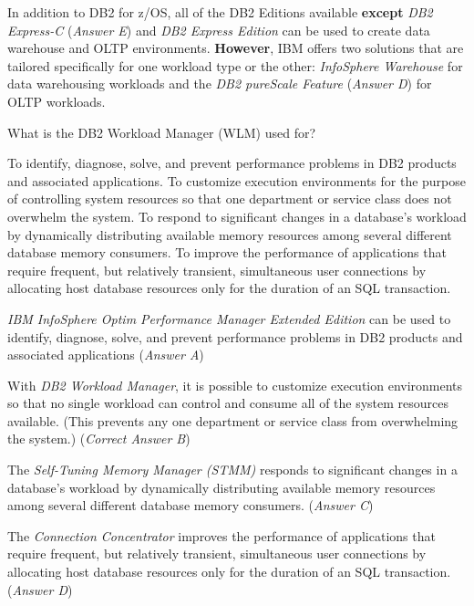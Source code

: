 \documentclass[answers, 11pt]{exam}
\begin{document}
\begin{questions}
\begin{solution}
In addition to DB2 for z/OS, all of the DB2 Editions available \textbf{except} 
\textit{DB2 Express-C} (\textit{Answer E}) and \textit{DB2 Express Edition} can be
used to create data warehouse and OLTP environments. \textbf{However},
IBM offers two solutions that are tailored specifically for one workload type or
the other: \textit{InfoSphere Warehouse} for {\color{red} data warehousing} workloads
and the \textit{DB2 pureScale Feature} (\textit{Answer D}) for {\color{red} OLTP}
workloads.

\end{solution}


\question[1]
What is the DB2 Workload Manager (WLM) used for?
\begin{choices}
\choice To identify, diagnose, solve, and prevent performance problems in DB2 products and associated applications.
\CorrectChoice To customize execution environments for the purpose of controlling system resources so that one
		department or service class does not overwhelm the system.
\choice To respond to significant changes in a database's workload by dynamically distributing available memory resources
		among several different database memory consumers.
\choice To improve the performance of applications that require frequent, but relatively transient, simultaneous user
		connections by allocating host database resources only for the duration of an SQL transaction.
\end{choices}

\begin{solution}
\textit{IBM InfoSphere Optim Performance Manager Extended Edition} can be used to 
identify, diagnose, solve, and prevent performance problems in DB2 products and
associated applications (\textit{Answer A})
\par

With \textit{DB2 Workload Manager}, it is possible to customize execution
environments so that no single workload can control and consume all of the system
resources available. (This prevents any one department or service class from
overwhelming the system.) (\textit{Correct Answer B})
\par

The \textit{Self-Tuning Memory Manager (STMM)} responds to significant changes in
a database's workload by dynamically distributing available memory resources among
several different database memory consumers. (\textit{Answer C})
\par

The \textit{Connection Concentrator} improves the performance of applications that
require frequent, but relatively transient, simultaneous user connections by
allocating host database resources only for the duration of an SQL transaction. 
(\textit{Answer D})


\end{solution}
\end{questions}
\end{document}

